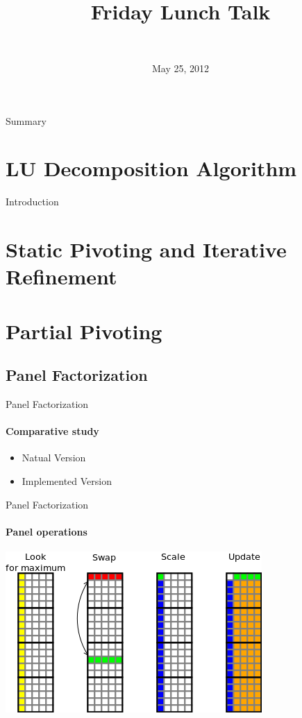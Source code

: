 \documentclass{beamer}
\title[LU decomposition on DaGUE]{
        {\bfseries \projet\\} 
        {\bfseries \huge \sujet}
        {\small Friday Lunch Talk}
}
\date{May 25, 2012}
\author[Zenati]{
  {\normalsize \bfseries \sffamily} {\large \gA}\\
}
\begin{document}
        
\begin{frame}
\maketitle
\end{frame}

\begin{frame}{Summary}
\tableofcontents
\end{frame}


\section{LU Decomposition Algorithm}
\begin{frame}{Introduction}

\end{frame}

\section{Static Pivoting and Iterative Refinement}
\begin{frame}{}
\end{frame}

\section{Partial Pivoting}

\subsection{Panel Factorization}
\begin{frame}{Panel Factorization}
\framesubtitle{Comparative study}
\begin{itemize}
\item Natual Version
\item Implemented Version
\end{itemize}
\end{frame}

\begin{frame}{Panel Factorization}
\framesubtitle{Panel operations}
\begin{center}
\includegraphics[scale=0.8]{panel_operation.png}
\end{center}
\end{frame}
\end{document}
